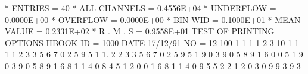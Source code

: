 \begin{Listing}
 * ENTRIES =         40      * ALL CHANNELS = 0.4556E+04      * UNDERFLOW = 0.0000E+00      * OVERFLOW = 0.0000E+00
 * BIN WID = 0.1000E+01      * MEAN VALUE   = 0.2331E+02      * R . M . S = 0.9558E+01
\newpage\relax TEST OF PRINTING OPTIONS
 HBOOK     ID =      1000                                        DATE  17/12/91              NO =  12
                         100                                                                       1   1   1   1   2   3
                          10                               1   1   1   1   2   3   3   5   6   7   0   2   5   9   5   1
                           1.  2   2   3   3   5   6   7   0   2   5   9   5   1   9   0   3   9   0   5   8   9   1   6
                           0   0   5   1   9   0   3   9   0   5   8   9   1   6   8   1   1   4   0   8   4   5   1   2
                           0   0   1   6   8   1   1   4   0   9   5   5   2   2   1   2   0   3   0   9   9   3   9   3
 

\end{Listing}
